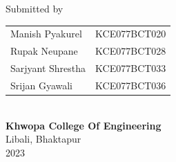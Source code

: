 \begin{center}
		\vspace{0.2in}
		\large{Submitted by}\\
		\vspace{0.1in}
		\begin{tabular}{p{3.5in}p{2in}}
			\hspace{0.3cm}Manish Pyakurel& \hspace{1cm}KCE077BCT020\\
			\hspace{0.3cm}Rupak Neupane& \hspace{1cm}KCE077BCT028\\
			\hspace{0.3cm}Sarjyant Shrestha& \hspace{1cm}KCE077BCT033\\
			\hspace{0.3cm}Srijan Gyawali& \hspace{1cm}KCE077BCT036\\
		\end{tabular}
		\\
		\vspace{1cm}
			\vspace{0.8cm}
		\large{\textbf{Khwopa College Of Engineering}\\}
			\normalsize{Libali, Bhaktapur\\
			2023
		}
    \end{center}
